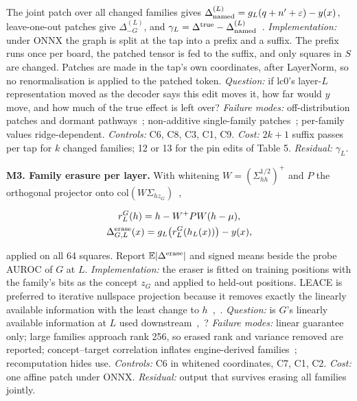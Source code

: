 \documentclass[conference]{IEEEtran}
\begin{document}
The joint patch over all changed families gives $\Delta^{(L)}_{\rm named}=g_L(q+n'+\varepsilon)-y(x)$, leave-one-out patches give $\Delta^{(L)}_{-G}$, and $\gamma_L=\Delta^{\rm true}-\Delta^{(L)}_{\rm named}$~\cite{rubenstein2017}. \emph{Implementation:} under ONNX the graph is split at the tap into a prefix and a suffix. The prefix runs once per board, the patched tensor is fed to the suffix, and only squares in $S$ are changed. Patches are made in the tap's own coordinates, after LayerNorm, so no renormalisation is applied to the patched token. \emph{Question:} if lc0's layer-$L$ representation moved as the decoder says this edit moves it, how far would $y$ move, and how much of the true effect is left over? \emph{Failure modes:} off-distribution patches and dormant pathways~\cite{makelov2024}; non-additive single-family patches~\cite{heimersheim2024}; per-family values ridge-dependent. \emph{Controls:} C6, C8, C3, C1, C9. \emph{Cost:} $2k+1$ suffix passes per tap for $k$ changed families; 12 or 13 for the pin edits of Table 5. \emph{Residual:} $\gamma_L$.

\textbf{M3. Family erasure per layer.} With whitening $W=(\Sigma_{hh}^{1/2})^{+}$ and $P$ the orthogonal projector onto $\mathrm{col}(W\Sigma_{hz_G})$~\cite{belrose2023},

\[
\begin{gathered}r^G_L(h)=h-W^{+}PW(h-\mu),\\
\Delta^{\rm erase}_{G,L}(x)=g_L\big(r^G_L(h_L(x))\big)-y(x),\end{gathered}
\]

applied on all 64 squares. Report $\mathbb E|\Delta^{\rm erase}|$ and signed means beside the probe AUROC of $G$ at $L$. \emph{Implementation:} the eraser is fitted on training positions with the family's bits as the concept $z_G$ and applied to held-out positions. LEACE is preferred to iterative nullspace projection because it removes exactly the linearly available information with the least change to $h$~\cite{belrose2023},~\cite{ravfogel2020}. \emph{Question:} is $G$'s linearly available information at $L$ used downstream~\cite{elazar2021},~\cite{palsson2024}? \emph{Failure modes:} linear guarantee only; large families approach rank 256, so erased rank and variance removed are reported; concept--target correlation inflates engine-derived families~\cite{kumarA2022}; recomputation hides use. \emph{Controls:} C6 in whitened coordinates, C7, C1, C2. \emph{Cost:} one affine patch under ONNX. \emph{Residual:} output that survives erasing all families jointly.
\end{document}
